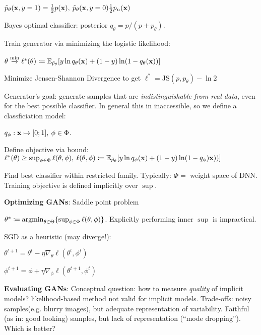 \tab $\Tilde{p}_\theta (\mathbf x,y=1)=\frac{1}{2}p(\mathbf x),\> \Tilde{p}_\theta(\mathbf x,y=0)\frac{1}{2}p_n(\mathbf x)$

Bayes optimal classifier: posterior $q_\theta=p/(p+p_\theta)$.

Train generator via minimizing the logistic likelihood:

\tab $\theta \overset{\min}{\xrightarrow{}}\ell^*(\theta)\coloneqq\mathbb E_{\Tilde{p}_\theta} \lbrack y \ln q_\theta(\mathbf x) + (1-y)\ln(1-q_\theta(\mathbf x))\rbrack$

Minimize Jensen-Shannon Divergence to get $\ell^*=\text{JS}(p,p_\theta)-\ln 2$

Generator's goal: generate samples that are \emph{indistinguishable from real data}, even for the best possible classifier. In general this in inaccessible, so we define a classficiation model:

\tab $q_\phi:\mathbf x\mapsto\lbrack 0;1 \rbrack,\> \phi\in\Phi$.

Define objective via bound: \\
\tab$\ell^*(\theta)\geq \sup_{\phi\in\Phi}\ell(\theta,\phi),\> \ell(\theta,\phi)\coloneqq\mathbb E_{\Tilde{p}_\theta} \lbrack y\ln q_\phi(\mathbf x) + (1-y)\ln(1-q_\phi)\mathbf x))\rbrack$

Find best classifier within restricted family. Typically: $\Phi=$ weight space of DNN. Training objective is defined implicitly over $\sup$.

\textbf{Optimizing GANs}: Saddle point problem

\tab $\theta^*\coloneqq \mathop{\mathrm{argmin}}_{\theta\in\Theta} \{\sup_{\phi\in\Phi} \ell(\theta,\phi)\}$. Explicitly performing inner $\sup$ is impractical. 

SGD as a heuristic (may diverge!):

\tab $\theta^{t+1}=\theta^t-\eta\nabla_\theta\ell(\theta^t,\phi^t)$

\tab $\phi^{t+1}=\phi+\eta\nabla_\phi\ell(\theta^{t+1},\phi^t)$

\textbf{Evaluating GANs}: Conceptual question: how to measure \emph{quality} of implicit models? likelihood-based method not valid for implicit models. Trade-offs: noisy samples(e.g. blurry images), but adequate representation of variability. Faithful (as in: good looking) samples, but lack of representation (``mode dropping''). Which is better?



